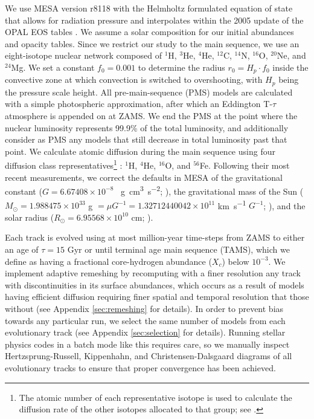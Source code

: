 \documentclass[manuscript]{aastex}
\begin{document}
We use MESA version r8118 with the Helmholtz formulated equation of state that allows for radiation pressure and interpolates within the 2005 update of the OPAL EOS tables \citep{2002ApJ...576.1064R}. We assume a \citet{1998SSRv...85..161G} solar composition for our initial abundances and opacity tables. Since we restrict our study to the main sequence, we use an eight-isotope nuclear network composed of $^1$H, $^3$He, $^4$He, $^{12}$C, $^{14}$N, $^{16}$O, $^{20}$Ne, and $^{24}$Mg. We set a constant $f_0 = 0.001$ to determine the radius $r_0 = H_p \cdot f_0$ inside the convective zone at which convection is switched to overshooting, with $H_p$ being the pressure scale height. All pre-main-sequence (PMS) models are calculated with a simple photospheric approximation, after which an Eddington T-$\tau$ atmosphere is appended on at ZAMS. We end the PMS at the point where the nuclear luminosity represents 99.9\% of the total luminosity, and additionally consider as PMS any models that still decrease in total luminosity past that point. %
We calculate atomic diffusion during the main sequence using four diffusion class representatives\footnote{The atomic number of each representative isotope is used to calculate the diffusion rate of the other isotopes allocated to that group; see \citealt{Paxton2011}.} : $^1$H, $^4$He, $^{16}$O, and $^{56}$Fe. 
Following their most recent measurements, we correct the defaults in MESA of the gravitational constant ($G=6.67408\times 10^{-8}$ \si{\per\g\cm\cubed\per\square\s}; \citealt{2015arXiv150707956M}), the gravitational mass of the Sun ($M_\odot = 1.988475\times 10^{33}$ \si{\g} $= \mu G^{-1} = 1.32712440042\times 10^{11}$ \si{\km\per\s} $G^{-1}$; \citealt{pitjeva2015determination}), and the solar radius ($R_\odot = 6.95568\times 10^{10}$ \si{\cm}; \citealt{2008ApJ...675L..53H}). 

Each track is evolved using at most million-year time-steps from ZAMS to either an age of $\tau=15$ Gyr or until terminal age main sequence (TAMS), which we define as having a fractional core-hydrogen abundance ($X_c$) below $10^{-3}$. We implement adaptive remeshing by recomputing with a finer resolution any track with discontinuities in its surface abundances, which occurs as a result of models having efficient diffusion requiring finer spatial and temporal resolution that those without (see Appendix \ref{sec:remeshing} for details). In order to prevent bias towards any particular run, we select the same number of models from each evolutionary track (see Appendix \ref{sec:selection} for details). Running stellar physics codes in a batch mode like this requires care, so we manually inspect Hertzsprung-Russell, Kippenhahn, and Christensen-Dalsgaard diagrams of all evolutionary tracks to ensure that proper convergence has been achieved. %
\end{document}
